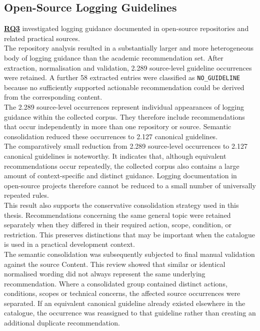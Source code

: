 \subsection{Open-Source Logging Guidelines}

\hyperref[table:t1rq]{\textbf{RQ3}} investigated logging guidance documented in open-source repositories and
related practical sources.
\\
The repository analysis resulted in a substantially larger and more heterogeneous body of logging guidance
than the academic recommendation set. After extraction, normalisation and validation, 2.289 source-level 
guideline occurrences were retained. A further 58 extracted entries were classified as \texttt{NO\_GUIDELINE} 
because no sufficiently supported actionable recommendation could be derived from the corresponding content.
\\
The 2.289 source-level occurrences represent individual appearances of logging guidance within the collected corpus. 
They therefore include recommendations that occur independently in more than one repository or source. 
Semantic consolidation reduced these occurrences to 2.127 canonical guidelines.
\\
The comparatively small reduction from 2.289 source-level occurrences to 2.127 canonical guidelines is noteworthy. 
It indicates that, although equivalent recommendations occur repeatedly, the collected corpus also contains a large 
amount of context-specific and distinct guidance. Logging documentation in open-source projects therefore cannot be 
reduced to a small number of universally repeated rules.
\\
This result also supports the conservative consolidation strategy used in this thesis. 
Recommendations concerning the same general topic were retained separately when they differed in their required action, 
scope, condition, or restriction. This preserves distinctions that may be important when the catalogue is used in a practical development context.
\\
The semantic consolidation was subsequently subjected to final manual validation against the source Content. 
This review showed that similar or identical normalised wording did not always represent the same underlying recommendation. 
Where a consolidated group contained distinct actions, conditions, scopes or technical concerns, the affected source occurrences were separated. 
If an equivalent canonical guideline already existed elsewhere in the catalogue, the occurrence was reassigned to that guideline rather than creating an additional duplicate recommendation. 
